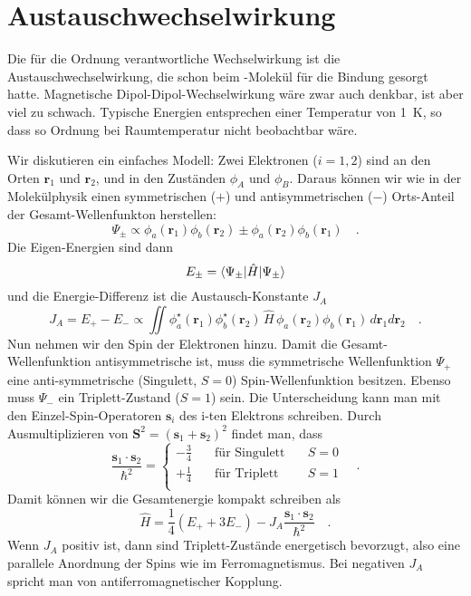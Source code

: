 \section*{Austauschwechselwirkung}

Die für die Ordnung verantwortliche Wechselwirkung ist die Austauschwechselwirkung, die schon beim -Molekül für die Bindung gesorgt hatte. Magnetische Dipol-Dipol-Wechselwirkung wäre zwar auch denkbar, ist aber viel zu schwach. Typische Energien entsprechen einer Temperatur von 1~K, so dass so Ordnung bei Raumtemperatur nicht beobachtbar wäre.

Wir diskutieren ein einfaches Modell: Zwei Elektronen ($i=1,2$) sind an den Orten $\bm{r}_1$ und $\bm{r}_2$, und in den Zuständen $\phi_A$ und $\phi_B$. Daraus können wir wie in der Molekülphysik einen symmetrischen ($+$) und antisymmetrischen ($-$)  Orts-Anteil der Gesamt-Wellenfunkton herstellen:
\begin{equation}
    \Psi_\pm  \propto \phi_a(\bm{r}_1) \phi_b(\bm{r}_2) \pm \phi_a(\bm{r}_2) \phi_b(\bm{r}_1)  \quad .
\end{equation}
Die Eigen-Energien sind dann 
\begin{equation}
    E_\pm = \braket{\Psi_\pm | \hat{H} | \Psi_\pm}
\end{equation}
und die Energie-Differenz ist die Austausch-Konstante $J_A$
\begin{equation}
    J_A = E_+ - E_-  \propto \iint \phi_a^\star(\bm{r}_1) \phi_b^\star(\bm{r}_2)  \,
    \hat{H} \, \phi_a(\bm{r}_2) \phi_b(\bm{r}_1) \, d\bm{r}_1   d\bm{r}_2   \quad .
\end{equation}
Nun nehmen wir den Spin der Elektronen hinzu. Damit die Gesamt-Wellenfunktion antisymmetrische ist, muss die symmetrische Wellenfunktion $\Psi_+$  eine anti-symmetrische (Singulett, $S=0$) Spin-Wellenfunktion besitzen. Ebenso muss $\Psi_-$  ein Triplett-Zustand ($S=1$) sein. Die Unterscheidung kann man mit den Einzel-Spin-Operatoren   $\bm{s}_i$  des i-ten Elektrons schreiben. Durch Ausmultiplizieren von $\bm{S}^2 = (\bm{s}_1  + \bm{s}_2 )^2$ findet man, dass
\begin{equation}
    \frac{\bm{s}_1 \cdot \bm{s}_2}{\hbar^2}
    = \left\{ \begin{matrix}
        - \frac{3}{4} \quad & \text{für Singulett} \quad &S=0 \\
        + \frac{1}{4} \quad & \text{für Triplett} \quad & S=1 \\
    \end{matrix}
    \right.   \quad .
\end{equation} 
Damit können wir die Gesamtenergie kompakt schreiben als
\begin{equation}
    \hat{H} = \frac{1}{4} (E_+ + 3 E_-) - J_A \frac{\bm{s}_1 \cdot \bm{s}_2}{\hbar^2}  \quad .
    \label{eq:7_H_austausch_2e}
\end{equation}
Wenn $J_A$ positiv ist, dann sind Triplett-Zustände energetisch bevorzugt, also eine parallele Anordnung der Spins wie im Ferromagnetismus. Bei negativen $J_A$ spricht man von antiferromagnetischer Kopplung.

